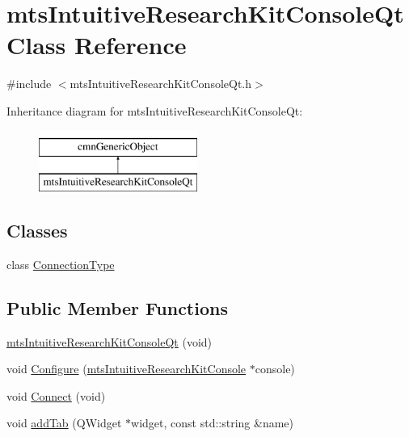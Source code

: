 \hypertarget{classmts_intuitive_research_kit_console_qt}{\section{mts\-Intuitive\-Research\-Kit\-Console\-Qt Class Reference}
\label{classmts_intuitive_research_kit_console_qt}
}


{\ttfamily \#include $<$mts\-Intuitive\-Research\-Kit\-Console\-Qt.\-h$>$}

Inheritance diagram for mts\-Intuitive\-Research\-Kit\-Console\-Qt\-:\begin{figure}[H]
\begin{center}
\leavevmode
\includegraphics[height=2.000000cm]{d8/d56/classmts_intuitive_research_kit_console_qt}
\end{center}
\end{figure}
\subsection*{Classes}
\begin{DoxyCompactItemize}
\item 
class \hyperlink{classmts_intuitive_research_kit_console_qt_1_1_connection_type}{Connection\-Type}
\end{DoxyCompactItemize}
\subsection*{Public Member Functions}
\begin{DoxyCompactItemize}
\item 
\hyperlink{classmts_intuitive_research_kit_console_qt_a8e70a6248e96445f943302f04dfd5881}{mts\-Intuitive\-Research\-Kit\-Console\-Qt} (void)
\item 
void \hyperlink{classmts_intuitive_research_kit_console_qt_a95bd1bf238d50f1a5d558467b6ebf42b}{Configure} (\hyperlink{classmts_intuitive_research_kit_console}{mts\-Intuitive\-Research\-Kit\-Console} $\ast$console)
\item 
void \hyperlink{classmts_intuitive_research_kit_console_qt_a2da606615cc643327541d48eeba6a951}{Connect} (void)
\item 
void \hyperlink{classmts_intuitive_research_kit_console_qt_ad2dd4b44cc31fb6297a47c926b46c3c3}{add\-Tab} (Q\-Widget $\ast$widget, const std\-::string \&name)
\end{DoxyCompactItemize}
